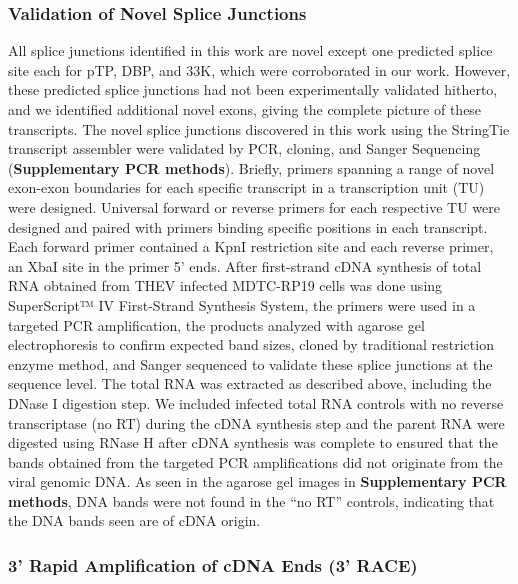 \documentclass[
]{article}
\begin{document}
\subsubsection{Validation of Novel Splice
Junctions}\label{validation-of-novel-splice-junctions}

All splice junctions identified in this work are novel except one
predicted splice site each for pTP, DBP, and 33K, which were
corroborated in our work. However, these predicted splice junctions had
not been experimentally validated hitherto, and we identified additional
novel exons, giving the complete picture of these transcripts. The novel
splice junctions discovered in this work using the StringTie transcript
assembler were validated by PCR, cloning, and Sanger Sequencing
(\textbf{Supplementary PCR methods}). Briefly, primers spanning a range
of novel exon-exon boundaries for each specific transcript in a
transcription unit (TU) were designed. Universal forward or reverse
primers for each respective TU were designed and paired with primers
binding specific positions in each transcript. Each forward primer
contained a KpnI restriction site and each reverse primer, an XbaI site
in the primer 5' ends. After first-strand cDNA synthesis of total RNA
obtained from THEV infected MDTC-RP19 cells was done using SuperScript™
IV First-Strand Synthesis System, the primers were used in a targeted
PCR amplification, the products analyzed with agarose gel
electrophoresis to confirm expected band sizes, cloned by traditional
restriction enzyme method, and Sanger sequenced to validate these splice
junctions at the sequence level. The total RNA was extracted as
described above, including the DNase I digestion step. We included
infected total RNA controls with no reverse transcriptase (no RT) during
the cDNA synthesis step and the parent RNA were digested using RNase H
after cDNA synthesis was complete to ensured that the bands obtained
from the targeted PCR amplifications did not originate from the viral
genomic DNA. As seen in the agarose gel images in \textbf{Supplementary
PCR methods}, DNA bands were not found in the ``no RT'' controls,
indicating that the DNA bands seen are of cDNA origin.

\subsubsection{3' Rapid Amplification of cDNA Ends (3'
RACE)}\label{rapid-amplification-of-cdna-ends-3-race}
\end{document}

